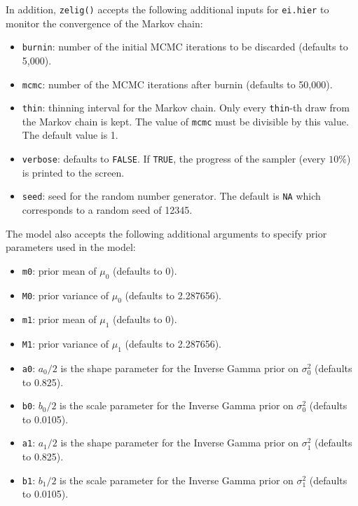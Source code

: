 In addition, {\tt zelig()} accepts the following additional inputs for
\texttt{ei.hier} to monitor the convergence of the Markov chain:

\begin{itemize}
\item \texttt{burnin}: number of the initial MCMC iterations to be 
 discarded (defaults to 5,000).

\item \texttt{mcmc}: number of the MCMC iterations after burnin
(defaults to 50,000).  

\item \texttt{thin}: thinning interval for the Markov chain. Only every 
 \texttt{thin}-th draw from the Markov chain is kept. The value of 
\texttt{mcmc} must be divisible by this value. The default value is 1.

\item \texttt{verbose}: defaults to {\tt FALSE}.  If \texttt{TRUE}, the progress 
 of the sampler (every $10\%$) is printed to the screen.  

\item \texttt{seed}: seed for the random number generator. The default is \texttt{NA} which
corresponds to a random seed of 12345. 

\end{itemize}

\noindent The model also accepts the following additional arguments to specify 
 prior parameters used in the model:

\begin{itemize}
\item \texttt{m0}: prior mean of $\mu_{0}$ (defaults to 0).

\item \texttt{M0}: prior variance of $\mu_{0}$ (defaults to 2.287656).

\item \texttt{m1}: prior mean of $\mu_{1}$ (defaults to 0).
 
\item \texttt{M1}: prior variance of $\mu_{1}$ (defaults to 2.287656).

\item \texttt{a0}: $a_{0}/2$ is the shape parameter for the Inverse Gamma
prior on $\sigma_{0}^{2}$ (defaults to 0.825).

\item \texttt{b0}: $b_{0}/2$ is the scale parameter for the Inverse Gamma
prior on $\sigma_{0}^{2}$ (defaults to 0.0105).

\item \texttt{a1}: $a_{1}/2$ is the shape parameter for the Inverse Gamma
prior on $\sigma_{1}^{2}$ (defaults to 0.825).

\item \texttt{b1}: $b_{1}/2$ is the scale parameter for the Inverse Gamma
prior on $\sigma_{1}^{2}$ (defaults to 0.0105).
\end{itemize}

